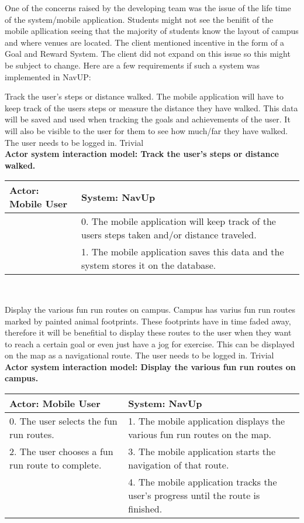 One of the concerns raised by the developing team was the issue of the life time of the system/mobile application. Students might not see the benifit of the mobile apllication seeing that the majority of students know the layout of campus and where venues are located. The client mentioned incentive in the form of a Goal and Reward System. The client did not expand on this issue so this might be subject to change. Here are a few requirements if such a system was implemented in NavUP:
\\
\bigskip

\FuncReq
{Track the user's steps or distance walked.}
{The mobile application will have to keep track of the users steps or measure the distance they have walked. This data will be saved and used when tracking the goals and achievements of the user. It will also be visible to the user for them to see how much/far they have walked.}
{The user needs to be logged in.}
{Trivial}
\\
\textbf{Actor system interaction model: Track the user's steps or distance walked.}\\
\begin{tabular}{ | p{6cm} | p{6cm} |}
\hline
Actor: Mobile User & System: NavUp \\ \hline
& 0. The mobile application will keep track of the users steps taken and/or distance traveled.\\ \hline
& 1. The mobile application saves this data and the system stores it on the database.\\ \hline
\end{tabular}
\\
\bigskip

\FuncReq
{Display the various fun run routes on campus.}
{Campus has varius fun run routes marked by painted animal footprints. These footprints have in time faded away, therefore it will be benefitial to display these routes to the user when they want to reach a certain goal or even just have a jog for exercise. This can be displayed on the map as a navigational route.}
{The user needs to be logged in.}
{Trivial}
\\
\textbf{Actor system interaction model: Display the various fun run routes on campus.}\\
\begin{tabular}{ | p{6cm} | p{6cm} |}
\hline
Actor: Mobile User & System: NavUp \\ \hline
0. The user selects the fun run routes. & 1. The mobile application displays the various fun run routes on the map.\\ \hline
2. The user chooses a fun run route to complete. & 3. The mobile application starts the navigation of that route.\\ \hline
& 4. The mobile application tracks the user's progress until the route is finished.\\ \hline
\end{tabular}
\\
\bigskip

